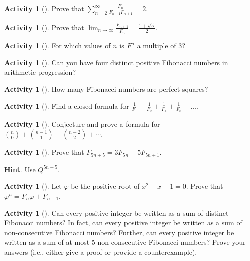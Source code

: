 \documentclass[10pt,]{book}
\theoremstyle{plain}
\theoremstyle{definition}
\theoremstyle{definition}
\theoremstyle{definition}
\newtheorem{activity}[project]{Activity}
\theoremstyle{definition}
\numberwithin{equation}{chapter}
\begin{document}
\begin{activity}[]\label{activity-105}
\hypertarget{p-882}{}%
Prove that \(\sum_{n = 2}^{\infty}\frac{F_{n}}{F_{n - 1}F_{n + 1}} = 2.\)%
\end{activity}
\begin{activity}[]\label{activity-106}
\hypertarget{p-883}{}%
Prove that \(\lim_{n\to\infty}\frac{F_{n + 1}}{F_{n}} = \frac{1 + \sqrt{5}}{2}.\)%
\end{activity}
\begin{activity}[]\label{activity-107}
\hypertarget{p-884}{}%
For which values of \(n\) is \(F^{n}\) a multiple of 3?%
\end{activity}
\begin{activity}[]\label{activity-108}
\hypertarget{p-885}{}%
Can you have four distinct positive Fibonacci numbers in arithmetic progression?%
\end{activity}
\begin{activity}[]\label{activity-109}
\hypertarget{p-886}{}%
How many Fibonacci numbers are perfect squares?%
\end{activity}
\begin{activity}[]\label{activity-110}
\hypertarget{p-887}{}%
Find a closed formula for \(\frac{1}{F_{1}} + \frac{1}{F_{2}} + \frac{1}{F_{4}} + \frac{1}{F_{8}} + \ldots.\)%
\end{activity}
\begin{activity}[]\label{activity-111}
\hypertarget{p-888}{}%
Conjecture and prove a formula for \(\binom{n}{0} + \binom{n-1}{1} + \binom{n-2}{2} + \cdots\).%
\end{activity}
\begin{activity}[]\label{activity-112}
\hypertarget{p-889}{}%
Prove that \(F_{5n + 5} = 3F_{5n} + 5F_{5n + 1}\).%
\par\smallskip%
\noindent\textbf{Hint}.\hypertarget{hint-89}{}\quad%
\hypertarget{p-890}{}%
Use \(Q^{5n + 5}\).%
\end{activity}
\begin{activity}[]\label{activity-113}
\hypertarget{p-891}{}%
Let \(\varphi\) be the positive root of \(x^{2} - x - 1 = 0\). Prove that \(\varphi^{n} = F_{n}\varphi + F_{n - 1}\).%
\end{activity}
\begin{activity}[]\label{activity-114}
\hypertarget{p-892}{}%
Can every positive integer be written as a sum of distinct Fibonacci numbers?  In fact, can every positive integer be written as a sum of non-consecutive Fibonacci numbers?  Further, can every positive integer be written as a sum of at most 5 non-consecutive Fibonacci numbers?  Prove your answers (i.e., either give a proof or provide a counterexample).%
\end{activity}
\typeout{************************************************}
\typeout{************************************************}
\end{document}
